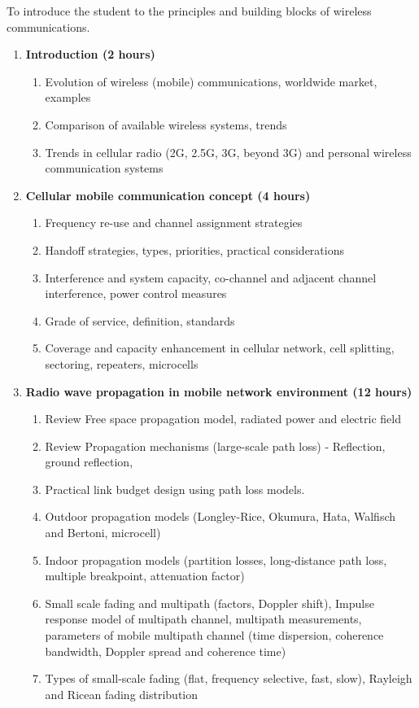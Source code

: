 
\cobjectives
  To introduce the student to the principles and building blocks of wireless communications.
  \VS

\begin{enumerate}
  \item \textbf{Introduction \hfill (2 hours)}
    \begin{enumerate}
      \item Evolution of wireless (mobile) communications, worldwide market, examples
      \item Comparison of available wireless systems, trends
      \item Trends in cellular radio (2G, 2.5G, 3G, beyond 3G) and personal wireless communication systems
    \end{enumerate}
    \vs

  \item \textbf{Cellular mobile communication concept \hfill (4 hours)}
    \begin{enumerate}
      \item Frequency re-use and channel assignment strategies
      \item Handoff strategies, types, priorities, practical considerations
      \item Interference and system capacity, co-channel and adjacent channel interference, power control measures
      \item Grade of service, definition, standards
      \item Coverage and capacity enhancement in cellular network, cell splitting, sectoring, repeaters, microcells
    \end{enumerate}
    \vs

  \item \textbf{Radio wave propagation in mobile network environment \hfill (12 hours)}
    \begin{enumerate}
      \item Review Free space propagation model, radiated power and electric field
      \item Review Propagation mechanisms (large-scale path loss) - Reflection, ground reflection, 
      \item Practical link budget design using path loss models.
      \item Outdoor propagation models (Longley-Rice, Okumura, Hata, Walfisch and Bertoni, microcell)
      \item Indoor  propagation models (partition losses, long-distance path loss, multiple breakpoint, attenuation factor)
      \item Small scale fading and multipath (factors, Doppler shift), Impulse response model of multipath channel, multipath measurements, parameters of mobile multipath channel (time dispersion, coherence bandwidth, Doppler spread and coherence time)
      \item Types of small-scale fading (flat, frequency selective, fast, slow), Rayleigh and Ricean fading distribution
    \end{enumerate}
    \vs


\end{enumerate}
